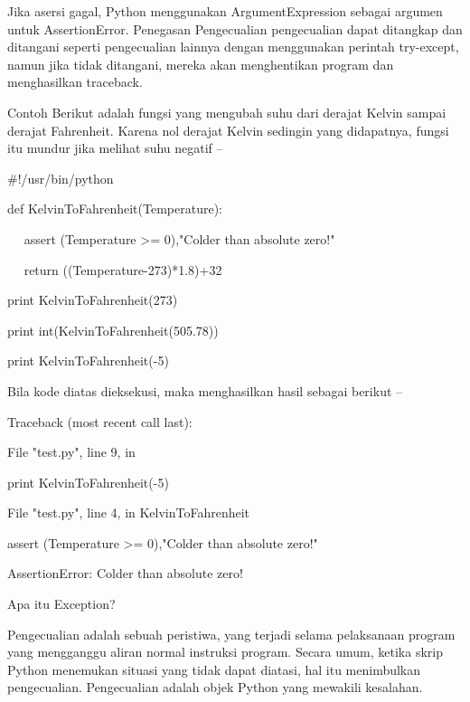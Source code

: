 \noindent 
 \hspace*{0.5in} Jika asersi gagal, Python menggunakan ArgumentExpression sebagai argumen untuk AssertionError. Penegasan Pengecualian pengecualian dapat ditangkap dan ditangani seperti pengecualian lainnya dengan menggunakan perintah try-except, namun jika tidak ditangani, mereka akan menghentikan program dan menghasilkan traceback. \par
\noindent 
Contoh Berikut adalah fungsi yang mengubah suhu dari derajat Kelvin sampai derajat Fahrenheit. Karena nol derajat Kelvin sedingin yang didapatnya, fungsi itu mundur jika melihat suhu negatif – \par
\vspace{12pt}
\noindent 
 $  \#  $!/usr/bin/python \par
\noindent 
def KelvinToFahrenheit(Temperature): \par
\noindent 
~~ assert (Temperature >= 0),"Colder than absolute zero!" \par
\noindent 
~~ return ((Temperature-273)*1.8)+32 \par
\noindent 
print KelvinToFahrenheit(273) \par
\noindent 
print int(KelvinToFahrenheit(505.78)) \par
\noindent 
print KelvinToFahrenheit(-5) \par
\vspace{14pt}
\noindent 
Bila kode diatas dieksekusi, maka menghasilkan hasil sebagai berikut – \par
\vspace{12pt}
 \par
{} \par
\noindent 
Traceback (most recent call last): \par
\noindent 
File "test.py", line 9, in  \par
\noindent 
print KelvinToFahrenheit(-5) \par
\noindent 
File "test.py", line 4, in KelvinToFahrenheit \par
\noindent 
assert (Temperature >= 0),"Colder than absolute zero!" \par
\noindent 
AssertionError: Colder than absolute zero! \par
\vspace{12pt}
\noindent 
Apa itu Exception? \par
\noindent 
Pengecualian adalah sebuah peristiwa, yang terjadi selama pelaksanaan program yang mengganggu aliran normal instruksi program. Secara umum, ketika skrip Python menemukan situasi yang tidak dapat diatasi, hal itu menimbulkan pengecualian. Pengecualian adalah objek Python yang mewakili kesalahan. \par
